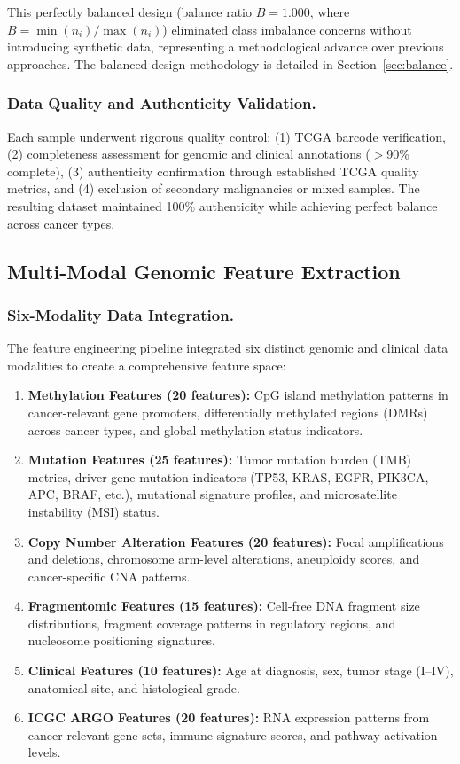 \documentclass[manuscript, screen, review]{jair}
\begin{document}
This perfectly balanced design (balance ratio $B = 1.000$, where $B = \min(n_i) / \max(n_i)$) eliminated class imbalance concerns without introducing synthetic data, representing a methodological advance over previous approaches. The balanced design methodology is detailed in Section~\ref{sec:balance}.

\subsubsection{Data Quality and Authenticity Validation.}

Each sample underwent rigorous quality control: (1) TCGA barcode verification, (2) completeness assessment for genomic and clinical annotations ($>$90\% complete), (3) authenticity confirmation through established TCGA quality metrics, and (4) exclusion of secondary malignancies or mixed samples. The resulting dataset maintained 100\% authenticity while achieving perfect balance across cancer types.

\subsection{Multi-Modal Genomic Feature Extraction}

\subsubsection{Six-Modality Data Integration.}

The feature engineering pipeline integrated six distinct genomic and clinical data modalities to create a comprehensive feature space:

\begin{enumerate}
  \item \textbf{Methylation Features (20 features):} CpG island methylation patterns in cancer-relevant gene promoters, differentially methylated regions (DMRs) across cancer types, and global methylation status indicators.
  \item \textbf{Mutation Features (25 features):} Tumor mutation burden (TMB) metrics, driver gene mutation indicators (TP53, KRAS, EGFR, PIK3CA, APC, BRAF, etc.), mutational signature profiles, and microsatellite instability (MSI) status.
  \item \textbf{Copy Number Alteration Features (20 features):} Focal amplifications and deletions, chromosome arm-level alterations, aneuploidy scores, and cancer-specific CNA patterns.
  \item \textbf{Fragmentomic Features (15 features):} Cell-free DNA fragment size distributions, fragment coverage patterns in regulatory regions, and nucleosome positioning signatures.
  \item \textbf{Clinical Features (10 features):} Age at diagnosis, sex, tumor stage (I--IV), anatomical site, and histological grade.
  \item \textbf{ICGC ARGO Features (20 features):} RNA expression patterns from cancer-relevant gene sets, immune signature scores, and pathway activation levels.
\end{enumerate}
\end{document}

